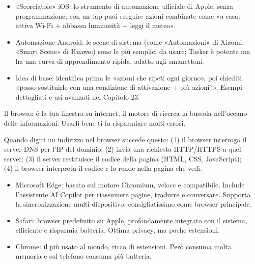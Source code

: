 \begin{itemize}
  \item «Scorciatoie» iOS: lo strumento di automazione ufficiale di Apple, senza programmazione; con un tap puoi eseguire azioni combinate come «a casa: attiva Wi-Fi + abbassa luminosità + leggi il meteo».
  \item Automazione Android: le scene di sistema (come «Automazioni» di Xiaomi, «Smart Scene» di Huawei) sono le più semplici da usare; Tasker è potente ma ha una curva di apprendimento ripida, adatto agli smanettoni.
  \item Idea di base: identifica prima le «azioni che ripeti ogni giorno», poi chiediti «posso sostituirle con una condizione di attivazione + più azioni?». Esempi dettagliati e usi avanzati nel Capitolo 23.
\end{itemize}


Il browser è la tua finestra su internet, il motore di ricerca la bussola nell'oceano delle informazioni. Usarli bene ti fa risparmiare molti errori.


Quando digiti un indirizzo nel browser succede questo: (1) il browser interroga il server DNS per l'IP del dominio; (2) invia una richiesta HTTP/HTTPS a quel server; (3) il server restituisce il codice della pagina (HTML, CSS, JavaScript); (4) il browser interpreta il codice e lo rende nella pagina che vedi.


\begin{itemize}
  \item Microsoft Edge: basato sul motore Chromium, veloce e compatibile. Include l'assistente AI Copilot per riassumere pagine, tradurre e conversare. Supporta la sincronizzazione multi-dispositivo; consigliatissimo come browser principale.
  \item Safari: browser predefinito su Apple, profondamente integrato con il sistema, efficiente e risparmia batteria. Ottima privacy, ma poche estensioni.
  \item Chrome: il più usato al mondo, ricco di estensioni. Però consuma molta memoria e sul telefono consuma più batteria.
\end{itemize}


